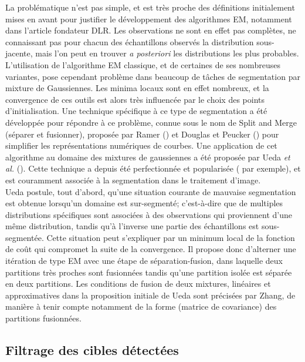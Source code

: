 La problématique n'est pas simple, et est très proche des définitions initialement mises en avant pour justifier le développement des algorithmes EM, notamment dans l'article fondateur DLR. Les observations ne sont en effet pas complètes, ne connaissant pas pour chacun des échantillons observés la distribution sous-jacente, mais l'on peut en trouver \textit{a posteriori} les distributions les plus probables. L'utilisation de l'algorithme EM classique, et de certaines de ses nombreuses variantes, pose cependant problème dans beaucoup de tâches de segmentation par mixture de Gaussiennes. Les minima locaux sont en effet nombreux, et la convergence de ces outils est alors très influencée par le choix des points d'initialisation. Une technique spécifique à ce type de segmentation a été développée pour répondre à ce problème, connue sous le nom de \og Split and Merge\fg{} (séparer et fusionner),
proposée par Ramer (\cite{Ramer1972}) et Douglas et Peucker (\cite{Douglas1973}) pour simplifier les représentations numériques de courbes. Une application de cet algorithme au domaine des mixtures de gaussiennes a été proposée par Ueda \textit{et al. }(\cite{Ueda2000}). Cette technique a depuis été perfectionnée et popularisée (\cite{Zhang2003} par exemple), et est couramment associée à la segmentation dans le traitement d'image.\\

Ueda postule, tout d'abord, qu'une situation courante de mauvaise segmentation est obtenue lorsqu'un domaine est sur-segmenté; c'est-à-dire que de multiples distributions spécifiques sont associées à des observations qui proviennent d'une même distribution, tandis qu'à l'inverse une partie des échantillons est sous-segmentée. Cette situation peut s'expliquer par un minimum local de la fonction de coût qui compromet la suite de la convergence. Il propose donc d'alterner une itération de type EM avec une étape de séparation-fusion, dans laquelle deux partitions très proches sont fusionnées tandis qu'une partition isolée est séparée en deux partitions. Les conditions de fusion de deux mixtures, linéaires et approximatives dans la proposition initiale de Ueda sont précisées par Zhang, de manière à tenir compte notamment de la forme (matrice de covariance) des partitions fusionnées.

\subsection{Filtrage des cibles détectées} \label{sec:ch5_filtrage_des_cibles}
